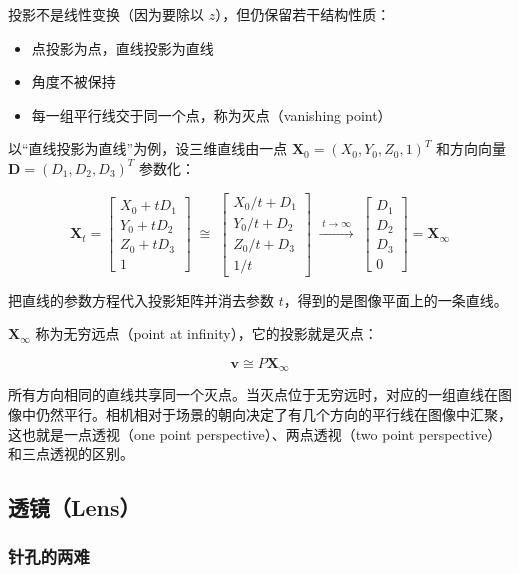 \documentclass{ctexart}
\begin{document}
投影不是线性变换（因为要除以 $z$），但仍保留若干结构性质：

\begin{itemize}
    \item 点投影为点，直线投影为直线
    \item 角度不被保持
    \item 每一组平行线交于同一个点，称为灭点（vanishing point）
\end{itemize}

以“直线投影为直线”为例，设三维直线由一点 $\boldsymbol{X}_0 = (X_0,Y_0,Z_0,1)^T$ 和方向向量 $\boldsymbol{D} = (D_1,D_2,D_3)^T$ 参数化：

\[
\boldsymbol{X}_t = \begin{bmatrix} X_0 + tD_1 \\ Y_0 + tD_2 \\ Z_0 + tD_3 \\ 1 \end{bmatrix}
\;\cong\; \begin{bmatrix} X_0/t + D_1 \\ Y_0/t + D_2 \\ Z_0/t + D_3 \\ 1/t \end{bmatrix}
\;\xrightarrow{\;t\to\infty\;}\; \begin{bmatrix} D_1 \\ D_2 \\ D_3 \\ 0 \end{bmatrix} = \boldsymbol{X}_\infty
\]

把直线的参数方程代入投影矩阵并消去参数 $t$，得到的是图像平面上的一条直线。

$\boldsymbol{X}_\infty$ 称为无穷远点（point at infinity），它的投影就是灭点：

\[
\boldsymbol{v} \cong P\boldsymbol{X}_\infty
\]

所有方向相同的直线共享同一个灭点。当灭点位于无穷远时，对应的一组直线在图像中仍然平行。相机相对于场景的朝向决定了有几个方向的平行线在图像中汇聚，这也就是一点透视（one point perspective）、两点透视（two point perspective）和三点透视的区别。

\subsection{透镜（Lens）}

\subsubsection{针孔的两难}
\end{document}
